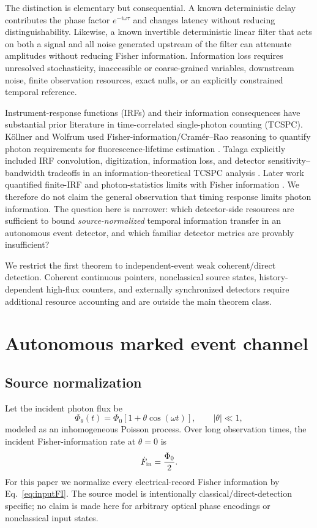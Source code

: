 \documentclass[aps,prapplied,preprint,nofootinbib]{revtex4-2}
\begin{document}
The distinction is elementary but consequential. A known deterministic delay contributes the phase factor $e^{-i\omega\tau}$ and changes latency without reducing distinguishability. Likewise, a known invertible deterministic linear filter that acts on both a signal and all noise generated upstream of the filter can attenuate amplitudes without reducing Fisher information. Information loss requires unresolved stochasticity, inaccessible or coarse-grained variables, downstream noise, finite observation resources, exact nulls, or an explicitly constrained temporal reference.

Instrument-response functions (IRFs) and their information consequences have substantial prior literature in time-correlated single-photon counting (TCSPC). K\"ollner and Wolfrum used Fisher-information/Cram\'er--Rao reasoning to quantify photon requirements for fluorescence-lifetime estimation \cite{KollnerWolfrum1992}. Talaga explicitly included IRF convolution, digitization, information loss, and detector sensitivity--bandwidth tradeoffs in an information-theoretical TCSPC analysis \cite{Talaga2009}. Later work quantified finite-IRF and photon-statistics limits with Fisher information \cite{Bouchet2019,TrinhEsposito2021}. We therefore do not claim the general observation that timing response limits photon information. The question here is narrower: which detector-side resources are sufficient to bound \emph{source-normalized} temporal information transfer in an autonomous event detector, and which familiar detector metrics are provably insufficient?

We restrict the first theorem to independent-event weak coherent/direct detection. Coherent continuous pointers, nonclassical source states, history-dependent high-flux counters, and externally synchronized detectors require additional resource accounting and are outside the main theorem class.

\section{Autonomous marked event channel}

\subsection{Source normalization}

Let the incident photon flux be
\begin{equation}
\Phi_\theta(t)=\Phi_0[1+\theta\cos(\omega t)],\qquad |\theta|\ll1,
\label{eq:source}
\end{equation}
modeled as an inhomogeneous Poisson process. Over long observation times, the incident Fisher-information rate at $\theta=0$ is
\begin{equation}
\dot F_{\rm in}=\frac{\Phi_0}{2}.
\label{eq:inputFI}
\end{equation}
For this paper we normalize every electrical-record Fisher information by Eq.~\eqref{eq:inputFI}. The source model is intentionally classical/direct-detection specific; no claim is made here for arbitrary optical phase encodings or nonclassical input states.
\end{document}
